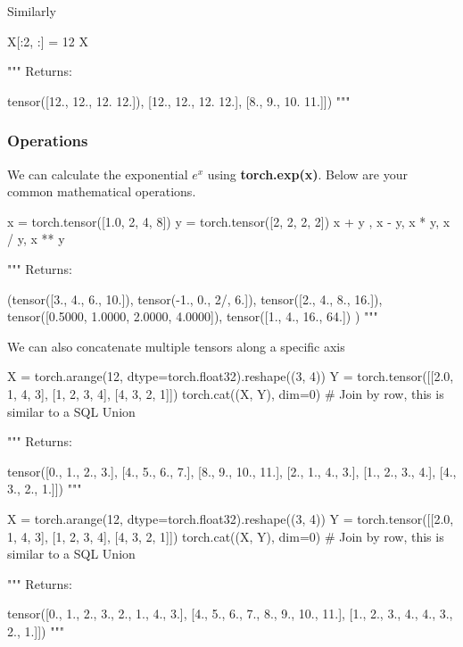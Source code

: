 \documentclass[12pt]{article}
\begin{document}
Similarly

\vspace{6pt}
\begin{python}
X[:2, :] = 12
X

"""
Returns:

  tensor([12., 12., 12. 12.]),
    [12., 12., 12. 12.],
    [8., 9., 10. 11.]])
"""
\end{python}
\vspace{6pt}

\subsubsection{Operations}
We can calculate the exponential $e^{x}$ using \textbf{torch.exp(x)}.  Below are your common mathematical operations.

\vspace{6pt}
\begin{python}
x = torch.tensor([1.0, 2, 4, 8])
y = torch.tensor([2, 2, 2, 2])
x + y , x - y, x * y, x / y, x ** y

"""
Returns:

  (tensor([3., 4., 6., 10.]),
    tensor(-1., 0., 2/, 6.]),
    tensor([2., 4., 8., 16.]),
    tensor([0.5000, 1.0000, 2.0000, 4.0000]),
    tensor([1., 4., 16., 64.])
    )
"""
\end{python}
\vspace{6pt}

We can also concatenate multiple tensors along a specific axis

\vspace{6pt}
\begin{python}
X = torch.arange(12, dtype=torch.float32).reshape((3, 4))
Y = torch.tensor([[2.0, 1, 4, 3],
  [1, 2, 3, 4],
  [4, 3, 2, 1]])
torch.cat((X, Y), dim=0) # Join by row, this is similar to a SQL Union

"""
Returns:

  tensor([0., 1., 2., 3.],
    [4., 5., 6., 7.],
    [8., 9., 10., 11.],
    [2., 1., 4., 3.],
    [1., 2., 3., 4.],
    [4., 3., 2., 1.]])
"""
\end{python}
\vspace{6pt}

\vspace{6pt}
\begin{python}
X = torch.arange(12, dtype=torch.float32).reshape((3, 4))
Y = torch.tensor([[2.0, 1, 4, 3],
  [1, 2, 3, 4],
  [4, 3, 2, 1]])
torch.cat((X, Y), dim=0) # Join by row, this is similar to a SQL Union

"""
Returns:

  tensor([0., 1., 2., 3., 2., 1., 4., 3.],
    [4., 5., 6., 7., 8., 9., 10., 11.],
    [1., 2., 3., 4., 4., 3., 2., 1.]])
"""
\end{python}
\vspace{6pt}
\end{document}
